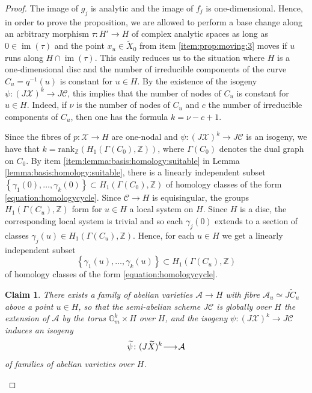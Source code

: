 \documentclass[a4paper,11pt,reqno]{amsart}
\makeatletter
\numberwithin{equation}{section}
\theoremstyle{plain}
\newtheorem{claim}[theorem]{Claim}
\theoremstyle{definition}
\newcommand{\Z}{\mathbb Z}
\newcommand{\bb}[1]{{\mathbb{#1}}}
\newcommand{\im}{\operatorname{im}}
\newcommand{\ca}[1]{{\mathcal{#1}}}
\newcommand{\wt}[1]{{\widetilde{#1}}}
\renewcommand{\longrightarrow}{\xymatrix@1@=15pt{\ar[r]&}}
\renewcommand{\cong}{\simeq}
\newcommand{\set}[1]{\left\{ #1 \right\}}
\makeatother
\begin{document}
\begin{proof}
The image of $g_j$ is analytic and the image of $f_j$ is one-dimensional.
Hence, in order to prove the proposition, we are allowed to perform a base change along an arbitrary morphism $\tau\colon H'\to H$ of complex analytic spaces as long as $0\in \im(\tau)$ and the point $x_u\in \widetilde X_0$  from item \ref{item:prop:moving:3} moves if $u$ runs along $H\cap \im(\tau)$. 
This easily reduces us to the situation where $H$ is a  one-dimensional  disc and the number of irreducible components of the curve $C_u = q^{-1}(u)$ is constant for $u \in H$. 
By the existence of the isogeny $\psi \colon (J\ca X)^k \to J\ca C$, this implies that the number of nodes of $C_u$ is constant for $u \in H$. 
Indeed, if $\nu$ is the number of nodes of $C_u$ and $c$ the number of irreducible components of $C_u$, then one has the formula $k = \nu - c + 1$.  

Since the fibres of $p\colon \mathcal X\to H$ are one-nodal and $\psi\colon (J\mathcal X)^k\to J\mathcal C$ is an isogeny, we have that $k = \text{rank}_\Z(H_1(\Gamma(C_0),\Z))$, where $\Gamma(C_0)$ denotes the dual graph on $C_0$.
By item \eqref{item:lemma:basis:homology:suitable} in Lemma 
\ref{lemma:basis:homology:suitable}, there is a linearly independent subset 
$
\set{\gamma_1(0), \dotsc, \gamma_k(0)} \subset H_1(\Gamma(C_0),\Z)
$
of homology classes of the form \eqref{equation:homologycycle}. 
Since $\mathcal C \to H$ is equisingular, the groups $H_1(\Gamma(C_u),\Z)$ form for $u\in H$ a local system on $H$.
Since $H$ is a disc, the corresponding local system is trivial and so each $\gamma_j(0)$ extends to a section of classes 
$
\gamma_j(u)\in H_1(\Gamma(C_u),\Z)$.
Hence, for each $u\in H$ we get a linearly independent subset 
\begin{equation}\label{eq:gamma_j(u)}
\set{\gamma_1(u), \dotsc, \gamma_k(u)} \subset  H_1(\Gamma(C_u),\Z)
\end{equation} 
of homology classes of the form \eqref{equation:homologycycle}. 

\begin{claim} \label{claim:global-extension}
There exists a family of abelian varieties 
$
\ca A \to H
$
with fibre $\ca A_u \cong J \wt C_u$ above a point $u \in H$, so that the semi-abelian scheme $J \ca C$ is globally over $H$ the extension of $\ca A$ by the torus $\bb G_m^{ k} \times H$ over $H$, and the isogeny $\psi \colon (J\ca X)^k \to J\ca C$ induces an isogeny 
\[
\wt \psi \colon (J \wt X)^k \longrightarrow \ca A
\]
of families of abelian varieties over $H$. 
\end{claim}


\end{proof}
\end{document}
